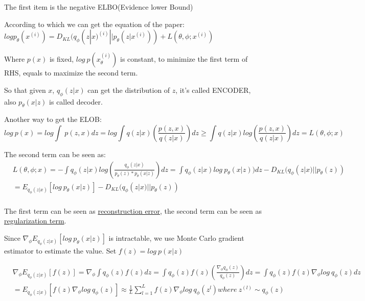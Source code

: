 \documentclass{article}
\begin{document}
The first item is the negative ELBO(Evidence lower Bound)

According to which we can get the equation of the paper:
$logp_\theta(x^{(i)}) = D_{KL}(q_\phi (z|x)^{(i)}||p_\theta(z|x^{(i)}))+ L(\theta,\phi;x^{(i)})$


Where $p(x)$ is fixed, $log\ p(x_\theta^{(i)})$ is constant, to minimize the first term of RHS, equals to maximize the second term.


So that given $x$, $q_\phi(z|x)$ can get the distribution of $z$, it's called ENCODER, also $p_\theta(x|z)$ is called decoder.


Another way to get the ELOB:
\begin{equation}
log\ p(x) = log\int\ p(z,x)dz=log\int q(z|x)(\frac{p(z,x)}{q(z|x)})dz \geq \int q(z|x)log(\frac{p(z,x)}{q(z|x)})dz = L(\theta, \phi;x)
\end{equation}

The second term can be seen as:
\begin{equation}
\begin{split}
&L(\theta, \phi;x) = -\int q_\phi(z|x) log(\frac{q_\phi(z|x)}{p_{\theta}(z)*p_{\theta}(x|z)})dz = \int q_\phi(z|x) log\ p_{\theta}(x|z))dz - D_{KL}(q_\phi(z|x)||p_\theta(z))\\
&=E_{q_\phi(z|x)}[log\ p_\theta(x|z)] - D_{KL}(q_\phi(z|x)||p_\theta(z))\\
\end{split}
\end{equation}


The first term can be seen as \underline{reconstruction error}, the second term can be seen as \underline{regularization term}.


Since $\nabla_\phi E_{q_\phi(z|x)}[log\ p_\theta(x|z)]$ is intractable, we use Monte Carlo gradient estimator to estimate the value. Set $f(z) = log\ p(x|z)$

\begin{equation}
\begin{split}
&\nabla_\phi E_{q_\phi(z|x)}[f(z)] = \nabla_\phi \int q_{\phi}(z)f(z)dz =  \int q_{\phi}(z)f(z)(\frac{\nabla_\phi q_{\phi}(z)}{q_{\phi}(z)})dz = \int q_{\phi}(z)f(z)\nabla_\phi log\ q_{\phi}(z) dz\\ 
&= E_{q_\phi(z|x)}[f(z)\nabla_\phi log\ q_{\phi}(z)] \approx \frac{1}{L}\sum_{l=1}^{L} f(z)\nabla_\phi log\ q_{\phi}(z^{l}) where\ z^{(l)} \sim q_\phi(z)\\
\end{split}
\end{equation}
\end{document}
